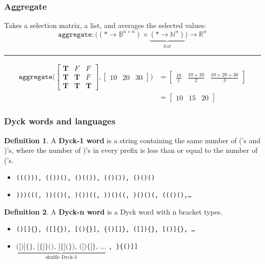 \documentclass[mathserif,notheorems]{beamer}
\newcommand{\cmark}{\color{green}\ding{51}}%
\newcommand{\xmark}{\color{red}\ding{55}}%
\theoremstyle{plain} %
\theoremstyle{definition} %
\newtheorem*{definition}{Definition} %
\begin{document}
    \begin{frame}
      \frametitle{Aggregate}
      Takes a selection matrix, a list, and averages the selected values:\\
      $$
      \texttt{aggregate}: \big((*→\mathbb{B}^{n\times n}) \times \underbrace{(*→\mathbb{N}^n)}_{list}\big) → \mathbb{R}^n
      $$
        \noindent\rule{\textwidth}{1pt}
    \begin{align*}
        \texttt{aggregate(}\begin{bmatrix}
        \textbf{T} & F & F \\
        \textbf{T} & \textbf{T} & F \\
        \textbf{T} & \textbf{T} & \textbf{T}
      \end{bmatrix},
      \begin{bmatrix}
        10 & 20 & 30
      \end{bmatrix}\texttt{)}
      &=
      \begin{bmatrix}
        \frac{10}{1} & \frac{10 + 20}{2} & \frac{10 + 20 + 30}{3}
      \end{bmatrix}\\
      &=
      \begin{bmatrix}
        10 & 15 & 20
      \end{bmatrix}
      \end{align*}
  \end{frame}

  \begin{frame}
    \frametitle[short frame title]{Dyck words and languages}
    \begin{tcolorbox}
      \begin{definition}

        A \textbf{Dyck-1 word} is a string containing the same number of ('s and )'s, where the number of )'s in every prefix is less than or equal to the number of ('s.
      \end{definition}
    \end{tcolorbox}

    \begin{itemize}
      \item[\cmark]\texttt{((())), (())(), ()(()), (()()), ()()()}
      \item[\xmark]\texttt{)))(((, ))(()(, )())((, ))()((, )()()(, ((()(),\ldots}
    \end{itemize}

    \begin{tcolorbox}
      \begin{definition}
        A \textbf{Dyck-n word} is a Dyck word with n bracket types.
      \end{definition}
    \end{tcolorbox}

    \begin{itemize}
      \item[\cmark]\texttt{()[]\{\}, ([]\{\}), [()\{\}], \{()[]\}, ([])\{\}, [()]\{\}, \ldots}
      \item[\xmark]$\underbrace{\texttt{([)]\{\}, [\{]\}(),  [\{](\}), ([)\{]\}, } \ldots}_{\text{shuffle Dyck-3}}$ \texttt{, \}\{()]]}
    \end{itemize}
  \end{frame}
\end{document}
